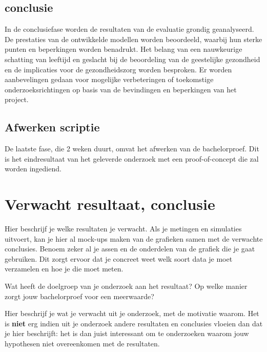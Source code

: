 \subsection{conclusie}
\label{sub:conclusie}
In de conclusiefase worden de resultaten van de evaluatie grondig geanalyseerd. De prestaties van de ontwikkelde modellen worden beoordeeld, waarbij hun sterke punten en beperkingen worden benadrukt. Het belang van een nauwkeurige schatting van leeftijd en geslacht bij de beoordeling van de geestelijke gezondheid en de implicaties voor de gezondheidszorg worden besproken. Er worden aanbevelingen gedaan voor mogelijke verbeteringen of toekomstige onderzoeksrichtingen op basis van de bevindingen en beperkingen van het project.
\subsection{Afwerken scriptie}
\label{sub:afwerken_scriptie}
De laatste fase, die 2 weken duurt, omvat het afwerken van de bachelorproef. Dit is het eindresultaat van het geleverde onderzoek met een proof-of-concept die zal worden ingediend. 


\section{Verwacht resultaat, conclusie}%
\label{sec:verwachte_resultaten}

Hier beschrijf je welke resultaten je verwacht. Als je metingen en simulaties uitvoert, kan je hier al mock-ups maken van de grafieken samen met de verwachte conclusies. Benoem zeker al je assen en de onderdelen van de grafiek die je gaat gebruiken. Dit zorgt ervoor dat je concreet weet welk soort data je moet verzamelen en hoe je die moet meten.

Wat heeft de doelgroep van je onderzoek aan het resultaat? Op welke manier zorgt jouw bachelorproef voor een meerwaarde?

Hier beschrijf je wat je verwacht uit je onderzoek, met de motivatie waarom. Het is \textbf{niet} erg indien uit je onderzoek andere resultaten en conclusies vloeien dan dat je hier beschrijft: het is dan juist interessant om te onderzoeken waarom jouw hypothesen niet overeenkomen met de resultaten.

